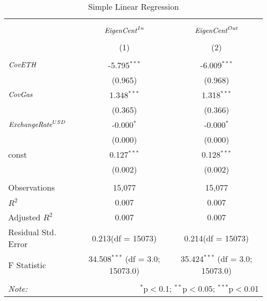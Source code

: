 \begin{table}[!htbp] \centering
  \caption{Simple Linear Regression}
\begin{tabular}{@{\extracolsep{5pt}}lcc}
\\[-1.8ex]\hline
\hline \\[-1.8ex]
\\[-1.8ex] & \multicolumn{1}{c}{${\it EigenCent}^{In}$} & \multicolumn{1}{c}{${\it EigenCent}^{Out}$}  \\
\\[-1.8ex] & (1) & (2) \\
\hline \\[-1.8ex]
 ${\it CovETH}$ & -5.795$^{***}$ & -6.009$^{***}$ \\
  & (0.965) & (0.968) \\
 ${\it CovGas}$ & 1.348$^{***}$ & 1.318$^{***}$ \\
  & (0.365) & (0.366) \\
 ${\it ExchangeRate}^{USD}$ & -0.000$^{*}$ & -0.000$^{*}$ \\
  & (0.000) & (0.000) \\
 const & 0.127$^{***}$ & 0.128$^{***}$ \\
  & (0.002) & (0.002) \\
\hline \\[-1.8ex]
 Observations & 15,077 & 15,077 \\
 $R^2$ & 0.007 & 0.007 \\
 Adjusted $R^2$ & 0.007 & 0.007 \\
 Residual Std. Error & 0.213(df = 15073) & 0.214(df = 15073)  \\
 F Statistic & 34.508$^{***}$ (df = 3.0; 15073.0) & 35.424$^{***}$ (df = 3.0; 15073.0) \\
\hline
\hline \\[-1.8ex]
\textit{Note:} & \multicolumn{2}{r}{$^{*}$p$<$0.1; $^{**}$p$<$0.05; $^{***}$p$<$0.01} \\
\end{tabular}
\end{table}